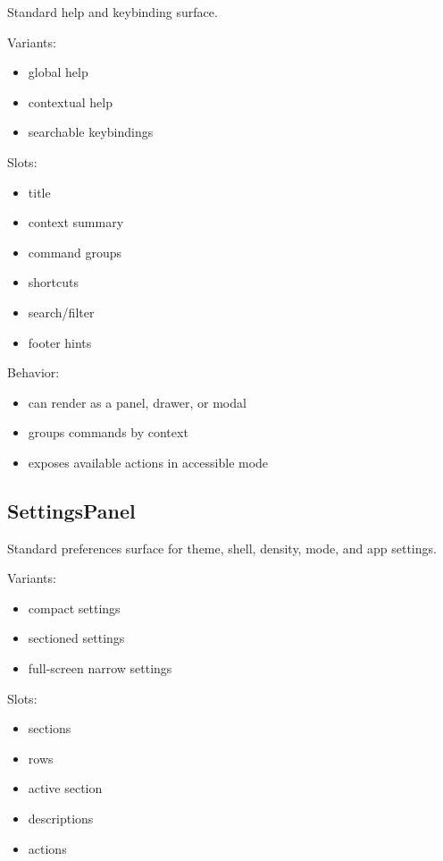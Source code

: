 Standard help and keybinding surface.

Variants:

\begin{itemize}
\tightlist
\item
  global help
\item
  contextual help
\item
  searchable keybindings
\end{itemize}

Slots:

\begin{itemize}
\tightlist
\item
  title
\item
  context summary
\item
  command groups
\item
  shortcuts
\item
  search/filter
\item
  footer hints
\end{itemize}

Behavior:

\begin{itemize}
\tightlist
\item
  can render as a panel, drawer, or modal
\item
  groups commands by context
\item
  exposes available actions in accessible mode
\end{itemize}

\subsection{SettingsPanel}\label{record-128-settingspanel}

Standard preferences surface for theme, shell, density, mode, and app settings.

Variants:

\begin{itemize}
\tightlist
\item
  compact settings
\item
  sectioned settings
\item
  full-screen narrow settings
\end{itemize}

Slots:

\begin{itemize}
\tightlist
\item
  sections
\item
  rows
\item
  active section
\item
  descriptions
\item
  actions
\end{itemize}

